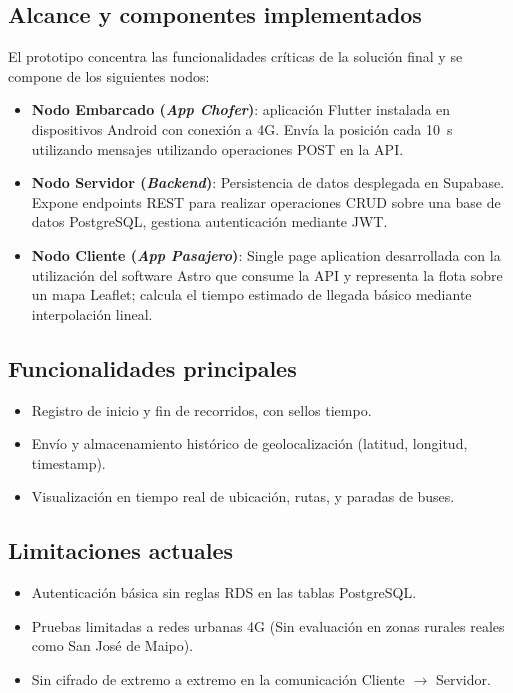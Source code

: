 \documentclass[12pt]{article}
\begin{document}
\subsection{Alcance y componentes implementados}
El prototipo concentra las funcionalidades críticas de la solución final y se compone de los siguientes nodos:
\begin{itemize}
\item \textbf{Nodo Embarcado (\emph{App Chofer})}: aplicación Flutter instalada en dispositivos Android con conexión a 4G.  Envía la posición cada 10~s utilizando mensajes utilizando operaciones POST en la API.
\item \textbf{Nodo Servidor (\emph{Backend})}: Persistencia de datos desplegada en Supabase. Expone endpoints REST para realizar operaciones CRUD sobre una base de datos PostgreSQL, gestiona autenticación mediante JWT.
\item \textbf{Nodo Cliente (\emph{App Pasajero})}: Single page aplication desarrollada con la utilización del software Astro que consume la API y representa la flota sobre un mapa Leaflet; calcula el tiempo estimado de llegada básico mediante interpolación lineal.
\end{itemize}

\subsection{Funcionalidades principales}
\begin{itemize}
\item Registro de inicio y fin de recorridos, con sellos tiempo.
\item Envío y almacenamiento histórico de geolocalización (latitud, longitud, timestamp).
\item Visualización en tiempo real de ubicación, rutas, y paradas de buses.
\end{itemize}

\subsection{Limitaciones actuales}
\begin{itemize}
\item Autenticación básica sin reglas RDS en las tablas PostgreSQL.
\item Pruebas limitadas a redes urbanas 4G (Sin evaluación en zonas rurales reales como San José de Maipo).
\item Sin cifrado de extremo a extremo en la comunicación Cliente $\xrightarrow{}$ Servidor.
\end{itemize}
\end{document}
